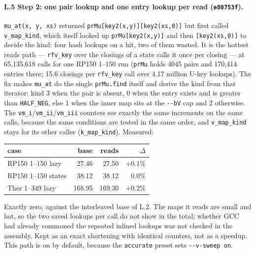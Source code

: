 \documentclass[11pt]{article}
\begin{document}
\paragraph{L.5 Step 2: one pair lookup and one entry lookup per read (\texttt{e80753f}).} \texttt{mu\_at(x, y, xs)} returned \texttt{prMu[key2(x,y)][key2(xs,0)]} but first called \texttt{v\_map\_kind}, which itself looked up \texttt{prMu[key2(x,y)]} and then \texttt{[key2(xs,0)]} to decide the kind: four hash lookups on a hit, two of them wasted. It is the hottest reads path --- \texttt{rfv\_key} over the closings of a state calls it once per closing --- at 65{,}135{,}618 calls for one RP150 1--150 run (\texttt{prMu} holds 4045 pairs and 170{,}414 entries there; 15.6 closings per \texttt{rfv\_key} call over 4.17 million U-key lookups). The fix makes \texttt{mu\_at} do the single \texttt{prMu.find} itself and derive the kind from that iterator: kind 3 when the pair is absent, 0 when the entry exists and is greater than \texttt{HALF\_NEG}, else 1 when the inner map sits at the \texttt{-{}-bV} cap and 2 otherwise. The \texttt{vm\_i}/\texttt{vm\_ii}/\texttt{vm\_iii} counters see exactly the same increments on the same calls, because the same conditions are tested in the same order, and \texttt{v\_map\_kind} stays for its other caller (\texttt{k\_map\_kind}). Measured:
\begin{center}
\begin{tabular}{@{}lrrr@{}}
\toprule
case & base & reads & $\Delta$ \\
\midrule
RP150 1--150 lazy & 27.46 & 27.50 & $+0.1\%$ \\
RP150 1--150 states & 38.12 & 38.12 & $0.0\%$ \\
Ther 1--349 lazy & 168.95 & 169.30 & $+0.2\%$ \\
\bottomrule
\end{tabular}
\end{center}
Exactly zero, against the interleaved base of L.2. The maps it reads are small and hot, so the two saved lookups per call do not show in the total; whether GCC had already commoned the repeated inlined lookups was not checked in the assembly. Kept as an exact shortening with identical counters, not as a speedup. This path is on by default, because the \texttt{accurate} preset sets \texttt{-{}-v-sweep on}.
\end{document}
